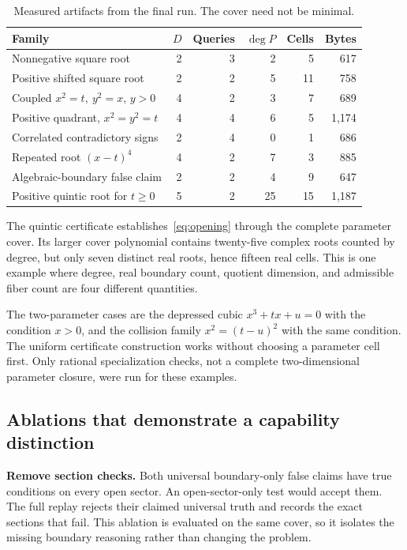 \begin{table}[ht]
\centering\small
\begin{tabularx}{\textwidth}{@{}Xrrrrr@{}}
\toprule
Family & $D$ & Queries & $\deg P$ & Cells & Bytes\\
\midrule
Nonnegative square root & 2 & 3 & 2 & 5 & 617\\
Positive shifted square root & 2 & 2 & 5 & 11 & 758\\
Coupled $x^2=t,\ y^2=x$, $y>0$ & 4 & 2 & 3 & 7 & 689\\
Positive quadrant, $x^2=y^2=t$ & 4 & 4 & 6 & 5 & 1,174\\
Correlated contradictory signs & 2 & 4 & 0 & 1 & 686\\
Repeated root $(x-t)^4$ & 4 & 2 & 7 & 3 & 885\\
Algebraic-boundary false claim & 2 & 2 & 4 & 9 & 647\\
Positive quintic root for $t\geq0$ & 5 & 2 & 25 & 15 & 1,187\\
\bottomrule
\end{tabularx}
\caption{Measured artifacts from the final run. The cover need not be minimal.}\label{tab:measured}
\end{table}

The quintic certificate establishes~\eqref{eq:opening} through the complete parameter cover. Its larger cover polynomial contains twenty-five complex roots counted by degree, but only seven distinct real roots, hence fifteen real cells. This is one example where degree, real boundary count, quotient dimension, and admissible fiber count are four different quantities.

The two-parameter cases are the depressed cubic $x^3+tx+u=0$ with the condition $x>0$, and the collision family $x^2=(t-u)^2$ with the same condition. The uniform certificate construction works without choosing a parameter cell first. Only rational specialization checks, not a complete two-dimensional parameter closure, were run for these examples.

\subsection{Ablations that demonstrate a capability distinction}

\textbf{Remove section checks.} Both universal boundary-only false claims have true conditions on every open sector. An open-sector-only test would accept them. The full replay rejects their claimed universal truth and records the exact sections that fail. This ablation is evaluated on the same cover, so it isolates the missing boundary reasoning rather than changing the problem.

